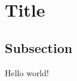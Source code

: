\documentclass{article}
\begin{document}
\section{Title}
\subsection{Subsection}
Hello world!

\end{document}
